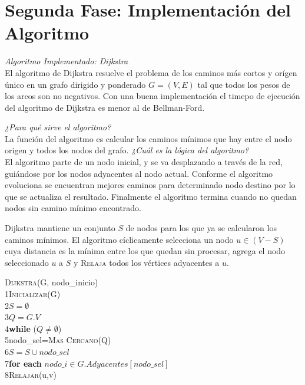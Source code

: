 \documentclass[12pt]{article} %
\begin{document}
\section{Segunda Fase: Implementación del Algoritmo} %
\textit{Algoritmo Implementado: Dijkstra}\\
El algoritmo de Dijkstra resuelve el problema de los caminos más cortos y orígen único en un  grafo dirigido y ponderado $G=(V,E)$ tal que todos los pesos de los arcos son no negativos. Con una buena implementación el timepo de ejecución del algoritmo de Dijkstra es menor al de Bellman-Ford.

\textit{¿Para qué sirve el algoritmo?}\\
La función del algoritmo es calcular los caminos mínimos que hay entre el nodo origen y todos los nodos del grafo.
\textit{¿Cuál es  la lógica del algoritmo?}\\
 El algoritmo parte de un nodo inicial, y se va desplazando a través de  la red, guiándose por los nodos adyacentes al nodo actual. 
Conforme el algoritmo evoluciona se encuentran mejores caminos para determinado nodo destino por lo que se actualiza el resultado. Finalmente el algoritmo termina cuando no quedan nodos sin camino mínimo encontrado.

Dijkstra mantiene un conjunto $S$ de nodos para los que ya se calcularon los caminos mínimos. El algoritmo cíclicamente selecciona un nodo $u \in (V-S)$ cuya distancia es la mínima entre los que quedan sin procesar, agrega el nodo seleccionado $u$ a $S$ y \textsc{ Relaja} todos los vértices adyacentes a $u$.

\begin{leftbar}
\textsc{Dijkstra}(G, nodo\_inicio)\\
1\indent	\textsc{Inicializar}(G)\\
2\indent	$S=\emptyset$\\
3\indent	$Q=G.V$\\
4\indent	\textbf{while} ($Q\neq\emptyset$)\\
5\indent\indent		nodo\_sel=\textsc{Mas Cercano}(Q)\\
6\indent\indent		$S=S\cup nodo\_sel$\\
7\indent\indent		\textbf{for each} $nodo\_i \in G.Adyacentes[nodo\_sel]$\\
8\indent\indent\indent			\textsc{Relajar}(u,v) 
\end{leftbar}
\end{document}
